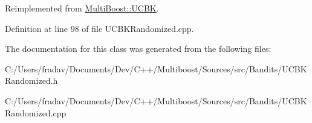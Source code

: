 Reimplemented from \hyperlink{classMultiBoost_1_1UCBK_a56d9c14616eaa82858b504603bcd077a}{Multi\-Boost\-::\-U\-C\-B\-K}.



Definition at line 98 of file U\-C\-B\-K\-Randomized.\-cpp.



The documentation for this class was generated from the following files\-:\begin{DoxyCompactItemize}
\item 
C\-:/\-Users/fradav/\-Documents/\-Dev/\-C++/\-Multiboost/\-Sources/src/\-Bandits/U\-C\-B\-K\-Randomized.\-h\item 
C\-:/\-Users/fradav/\-Documents/\-Dev/\-C++/\-Multiboost/\-Sources/src/\-Bandits/U\-C\-B\-K\-Randomized.\-cpp\end{DoxyCompactItemize}
